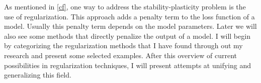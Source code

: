 As mentioned in \autoref{cf}, one way to address the stability-plasticity problem is the use of regularization. This approach adds a penalty term to the loss function of a model. Usually this penalty term depends on the model parameters. Later we will also see some methods that directly penalize the output of a model. I will begin by categorizing the regularization methods that I have found through out my research and present some selected examples. After this overview of current possibilities in regularization techniques, I will present attempts at unifying and generalizing this field. 